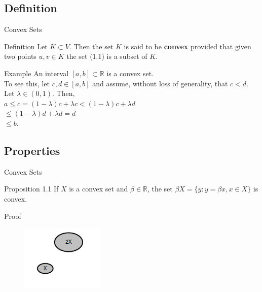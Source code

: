 \documentclass{beamer}
\begin{document}
\subsection{Definition}
\begin{frame}{Convex Sets}
\begin{block}{Definition}
Let $K \subset V$. Then the set $K$ is said to be \textbf{convex} provided that given two points $u, v \in K$ the set (1.1) is a subset of $K$.
\end{block}
\begin{exampleblock}{Example}
An interval $[a, b] \subset \mathbb{R}$ is a convex set. \\
To see this, let $c, d \in [a, b]$ and assume, without loss of generality, that $c < d$. Let $\lambda \in (0, 1)$. Then, \\
$a \leq c = (1 - \lambda) c + \lambda c < (1 - \lambda) c + \lambda d$ \\
\hspace{0.18cm} $\leq (1 - \lambda) d + \lambda d = d$ \\
\hspace{0.18cm} $\leq b.$
\end{exampleblock}
\end{frame}

\subsection{Properties}
\begin{frame}{Convex Sets}
\begin{block}{Proposition 1.1}
If $X$ is a convex set and $\beta \in \mathbb{R}$, the set $\beta X = \lbrace y : y = \beta x, x \in X \rbrace$ is convex.
\end{block}
\begin{block}{Proof}
\begin{figure}[h]
\includegraphics[width=4cm]{picture2}
\end{figure}
\end{block}
\end{frame}
\end{document}
